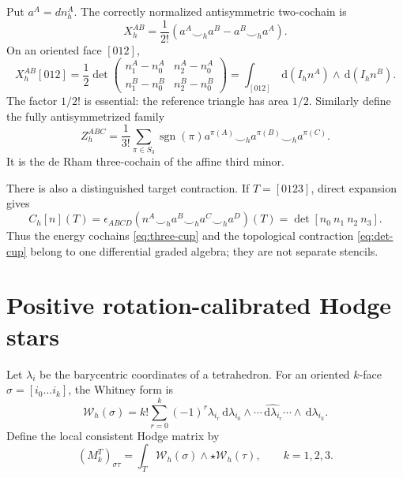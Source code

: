 \documentclass[11pt]{article}
\newcommand{\dd}{\,\mathrm d}
\newcommand{\cuph}{\smile_h}
\newcommand{\Wh}{\mathcal W_h}
\newcommand{\Ih}{I_h}
\begin{document}
Put $a^A=dn_h^A$.  The correctly normalized antisymmetric two-cochain is
\begin{equation}
 X_h^{AB}=\frac1{2!}\left(a^A\cuph a^B-a^B\cuph a^A\right).
 \label{eq:two-cup}
\end{equation}
On an oriented face $[012]$,
\begin{equation}
 X_h^{AB}[012]
 =\frac12\det
 \begin{pmatrix}
 n_1^A-n_0^A & n_2^A-n_0^A\\
 n_1^B-n_0^B & n_2^B-n_0^B
 \end{pmatrix}
 =\int_{[012]}\dd(\Ih n^A)\wedge\dd(\Ih n^B).
 \label{eq:two-exact}
\end{equation}
The factor $1/2!$ is essential: the reference triangle has area $1/2$.
Similarly define the fully antisymmetrized family
\begin{equation}
 Z_h^{ABC}=\frac1{3!}\sum_{\pi\in S_3}\operatorname{sgn}(\pi)
 a^{\pi(A)}\cuph a^{\pi(B)}\cuph a^{\pi(C)}.
 \label{eq:three-cup}
\end{equation}
It is the de Rham three-cochain of the affine third minor.

There is also a distinguished target contraction.  If
$T=[0123]$, direct expansion gives
\begin{equation}
 C_h[n](T)=\epsilon_{ABCD}
 \left(n^A\cuph a^B\cuph a^C\cuph a^D\right)(T)
 =\det[n_0\ n_1\ n_2\ n_3].
 \label{eq:det-cup}
\end{equation}
Thus the energy cochains \eqref{eq:three-cup} and the topological contraction
\eqref{eq:det-cup} belong to one differential graded algebra; they are not
separate stencils.

\section{Positive rotation-calibrated Hodge stars}

Let $\lambda_i$ be the barycentric coordinates of a tetrahedron.  For an
oriented $k$-face $\sigma=[i_0\ldots i_k]$, the Whitney form is
\begin{equation}
 \Wh(\sigma)=k!\sum_{r=0}^k(-1)^r\lambda_{i_r}
 \dd\lambda_{i_0}\wedge\cdots\widehat{\dd\lambda_{i_r}}
 \cdots\wedge\dd\lambda_{i_k}.
 \label{eq:whitney}
\end{equation}
Define the local consistent Hodge matrix by
\begin{equation}
 (M_k^T)_{\sigma\tau}
 =\int_T\Wh(\sigma)\wedge\star\Wh(\tau),
 \qquad k=1,2,3.
 \label{eq:hodge}
\end{equation}
\end{document}
